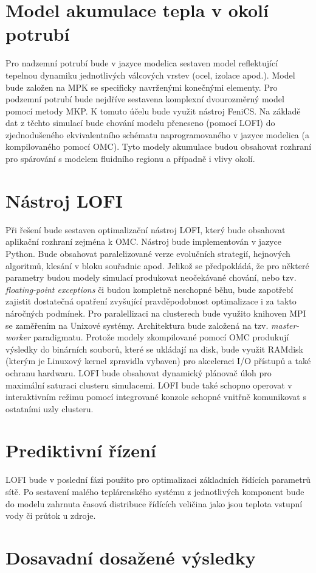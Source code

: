 \section{Model akumulace tepla v okolí potrubí}
\label{sec:PipeAcu}
Pro nadzemní potrubí bude v jazyce modelica sestaven model reflektující
tepelnou dynamiku jednotlivých válcových vrstev (ocel, izolace apod.). Model
bude založen na MPK se specificky navrženými konečnými elementy. Pro
podzemní potrubí bude nejdříve sestavena komplexní dvourozměrný model pomocí
metody MKP. K tomuto účelu bude využit nástroj FeniCS. Na základě dat z těchto
simulací bude chování modelu přeneseno (pomocí LOFI) do zjednodušeného
ekvivalentního schématu naprogramovaného v jazyce modelica (a kompilovaného
pomocí OMC). Tyto modely akumulace budou obsahovat rozhraní pro spárování s
modelem fluidního regionu a případně i vlivy okolí.
\section{Nástroj LOFI}
\label{sec:tool_LOFI}
Při řešení bude sestaven optimalizační nástroj LOFI, který bude obsahovat
aplikační rozhraní zejména k OMC. Nástroj bude implementován v jazyce Python.
Bude obsahovat paralelizované verze evolučních strategií, hejnových algoritmů,
klesání v bloku souřadnic apod. Jelikož se předpokládá, že pro některé
parametry budou modely simulací produkovat neočekávané chování, nebo tzv.
\textit{floating-point exceptions} či budou kompletně neschopné běhu, bude
zapotřebí zajistit dostatečná opatření zvyšující pravděpodobnost optimalizace i
za takto náročných podmínek. Pro paralellizaci na clusterech bude využito
knihoven MPI se zaměřením na Unixové systémy. Architektura bude založená na
tzv. \textit{master-worker} paradigmatu. Protože modely zkompilované
pomocí OMC produkují výsledky do binárních souborů, které se ukládají na disk,
bude využit RAMdisk (kterým je Linuxový kernel zpravidla vybaven) pro
akceleraci I/O přístupů a také ochranu hardwaru. LOFI bude obsahovat dynamický
plánovač úloh pro maximální saturaci clusteru simulacemi. LOFI bude také
schopno operovat v interaktivním režimu pomocí integrované konzole schopné
vnitřně komunikovat s ostatními uzly clusteru.
\section{Prediktivní řízení}
\label{sec:MPC}
LOFI bude v poslední fázi použito pro optimalizaci základních řídících
parametrů sítě. Po sestavení malého teplárenského systému z jednotlivých
komponent bude do modelu zahrnuta časová distribuce řídících veličina jako jsou
teplota vstupní vody či průtok u zdroje.
\section{Dosavadní dosažené výsledky}
\label{sec:Finished_parts}



